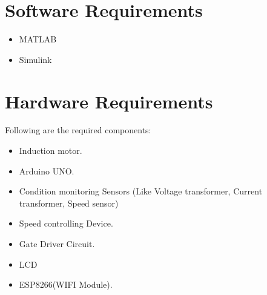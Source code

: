 \section{Software Requirements}
\begin{itemize}
    \item {MATLAB}
    \item {Simulink}
\end{itemize}

\section{Hardware Requirements}
Following are the required components:
\begin{itemize}
    \item {Induction motor.}
    \item {Arduino UNO.}
    \item {Condition monitoring Sensors (Like Voltage transformer, Current transformer, Speed sensor)}
    \item {Speed controlling Device.}
    \item {Gate Driver Circuit.}
    \item {LCD}
    \item {ESP8266(WIFI Module).}
\end{itemize}

